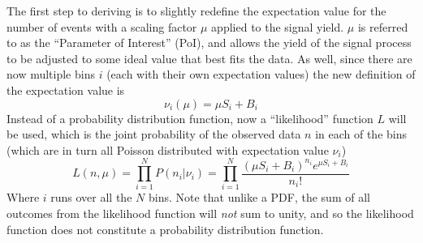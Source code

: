    The first step to deriving \qtil is to slightly redefine the expectation value for the number of events 
        with a scaling factor $\mu$ applied to the signal yield.
    $\mu$ is referred to as the ``Parameter of Interest'' (PoI),
        and allows the yield of the signal process to be adjusted to some ideal value that best fits the data.
    As well, since there are now multiple bins $i$ (each with their own expectation values)
        the new definition of the expectation value is
    \begin{equation}
        \nu_i(\mu) = \mu S_i + B_i
    \end{equation}
    Instead of a probability distribution function, now a ``likelihood'' function $L$ will be used,
        which is the joint probability of the observed data $n$ in each of the bins
        (which are in turn all Poisson distributed with expectation value $\nu_i$)
    \begin{equation}
        L(n,\mu) = \prod \limits_{i=1}^{N} P(n_i | \nu_i)
            = \prod \limits_{i=1}^{N} \frac{ (\mu S_i + B_i)^{n_i} e^{\mu S_i + B_i} }{n_i!}
    \end{equation}
    Where $i$ runs over all the $N$ bins.
    Note that unlike a PDF, the sum of all outcomes from the likelihood function will \textit{not} sum to unity,
        and so the likelihood function does not constitute a probability distribution function\cite{cousins2020likelihood}.

